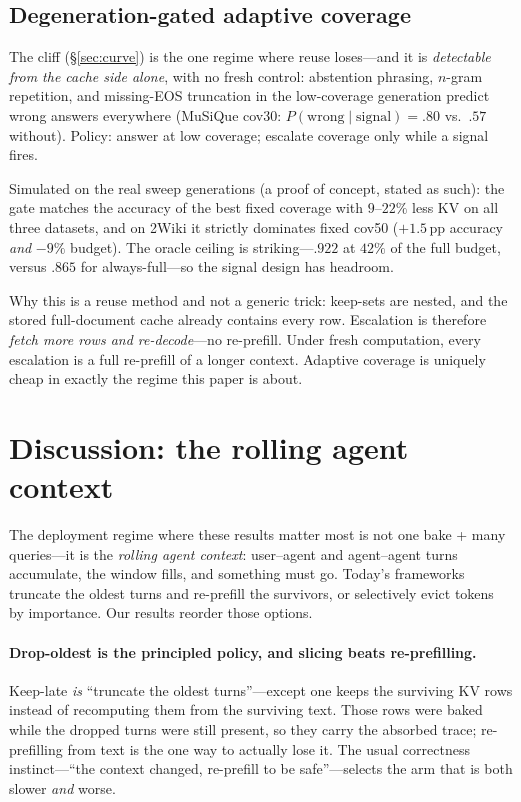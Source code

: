 \documentclass[11pt]{article}
\newcommand{\pp}{\,\mathrm{pp}}
\begin{document}
\subsection{Degeneration-gated adaptive coverage}
\label{sec:gate}

The cliff (\S\ref{sec:curve}) is the one regime where reuse loses---and it is \emph{detectable from the cache side alone}, with no fresh control: abstention phrasing, $n$-gram repetition, and missing-EOS truncation in the low-coverage generation predict wrong answers everywhere (MuSiQue cov30: $P(\text{wrong}\mid\text{signal})=.80$ vs.\ $.57$ without). Policy: answer at low coverage; escalate coverage only while a signal fires.

Simulated on the real sweep generations (a proof of concept, stated as such): the gate matches the accuracy of the best fixed coverage with $9$--$22\%$ less KV on all three datasets, and on 2Wiki it strictly dominates fixed cov50 ($+1.5\pp$ accuracy \emph{and} $-9\%$ budget). The oracle ceiling is striking---$.922$ at $42\%$ of the full budget, versus $.865$ for always-full---so the signal design has headroom.

Why this is a reuse method and not a generic trick: keep-sets are nested, and the stored full-document cache already contains every row. Escalation is therefore \emph{fetch more rows and re-decode}---no re-prefill. Under fresh computation, every escalation is a full re-prefill of a longer context. Adaptive coverage is uniquely cheap in exactly the regime this paper is about.

\section{Discussion: the rolling agent context}
\label{sec:outlook}

The deployment regime where these results matter most is not one bake + many queries---it is the \emph{rolling agent context}: user--agent and agent--agent turns accumulate, the window fills, and something must go. Today's frameworks truncate the oldest turns and re-prefill the survivors, or selectively evict tokens by importance. Our results reorder those options.

\paragraph{Drop-oldest is the principled policy, and slicing beats re-prefilling.}
Keep-late \emph{is} ``truncate the oldest turns''---except one keeps the surviving KV rows instead of recomputing them from the surviving text. Those rows were baked while the dropped turns were still present, so they carry the absorbed trace; re-prefilling from text is the one way to actually lose it. The usual correctness instinct---``the context changed, re-prefill to be safe''---selects the arm that is both slower \emph{and} worse.
\end{document}
